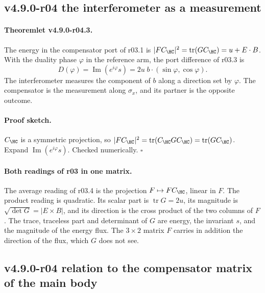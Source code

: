 \subsection*{v4.9.0-r04 the interferometer as a measurement}
\label{subsec:v490-r04-measurement}

\paragraph{Theoremlet v4.9.0-r04.3.}
The energy in the compensator port of r03.1 is \(|FC_{\HC}|^2=\operatorname{tr}(GC_{\HC})=u+E\cdot B\).  With the duality phase
\(\varphi\) in the reference arm, the port difference of r03.3 is
\[
D(\varphi)=\operatorname{Im}(e^{i\varphi}s)=2u\;b\cdot(\sin\varphi,\cos\varphi).
\]
The interferometer measures the component of \(b\) along a direction set by \(\varphi\).  The compensator is the
measurement along \(\sigma_x\), and its partner is the opposite outcome.

\paragraph{Proof sketch.}
\(C_{\HC}\) is a symmetric projection, so \(|FC_{\HC}|^2=\operatorname{tr}(C_{\HC}GC_{\HC})=\operatorname{tr}(GC_{\HC})\).
Expand \(\operatorname{Im}(e^{i\varphi}s)\).  Checked numerically.  \(\square\)

\paragraph{Both readings of r03 in one matrix.}
The average reading of r03.4 is the projection \(F\mapsto FC_{\HC}\), linear in \(F\).  The product reading is
quadratic.  Its scalar part is \(\operatorname{tr}G=2u\), its magnitude is \(\sqrt{\det G}=|E\times B|\), and its direction is
the cross product of the two columns of \(F\).  The trace, traceless part and determinant of \(G\) are energy, the
invariant \(s\), and the magnitude of the energy flux.  The \(3\times2\) matrix \(F\) carries in addition the direction of
the flux, which \(G\) does not see.

\subsection*{v4.9.0-r04 relation to the compensator matrix of the main body}
\label{subsec:v490-r04-hc-matrix}

